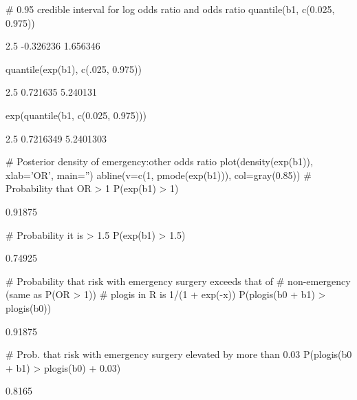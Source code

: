 \begin{Schunk}
\begin{Sinput}
# 0.95 credible interval for log odds ratio and odds ratio
quantile(b1, c(0.025, 0.975))
\end{Sinput}
\begin{Soutput}
     2.5%
-0.326236  1.656346 
\end{Soutput}
\begin{Sinput}
quantile(exp(b1), c(.025, 0.975))
\end{Sinput}
\begin{Soutput}
    2.5%
0.721635 5.240131 
\end{Soutput}
\begin{Sinput}
exp(quantile(b1,  c(0.025, 0.975)))
\end{Sinput}
\begin{Soutput}
     2.5%
0.7216349 5.2401303 
\end{Soutput}
\begin{Sinput}
# Posterior density of emergency:other odds ratio
plot(density(exp(b1)), xlab='OR', main='')
abline(v=c(1, pmode(exp(b1))), col=gray(0.85))
# Probability that OR > 1
P(exp(b1) > 1)
\end{Sinput}
\begin{Soutput}
[1] 0.91875
\end{Soutput}
\begin{Sinput}
# Probability it is > 1.5
P(exp(b1) > 1.5)
\end{Sinput}
\begin{Soutput}
[1] 0.74925
\end{Soutput}
\begin{Sinput}
# Probability that risk with emergency surgery exceeds that of
# non-emergency (same as P(OR > 1))
# plogis in R is 1/(1 + exp(-x))
P(plogis(b0 + b1) > plogis(b0))
\end{Sinput}
\begin{Soutput}
[1] 0.91875
\end{Soutput}
\begin{Sinput}
# Prob. that risk with emergency surgery elevated by more than 0.03
P(plogis(b0 + b1) > plogis(b0) + 0.03)
\end{Sinput}
\begin{Soutput}
[1] 0.8165
\end{Soutput}



\end{Schunk}
